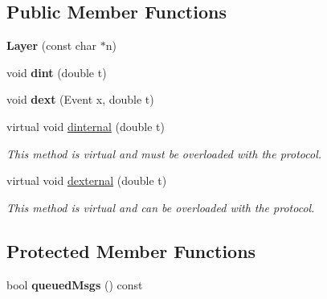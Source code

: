 \subsection*{Public Member Functions}
\begin{DoxyCompactItemize}
\item 
{\bfseries Layer} (const char $\ast$n)\hypertarget{classLayer_a61263cb897fd7d091830e5591c9ae3b0}{}\label{classLayer_a61263cb897fd7d091830e5591c9ae3b0}

\item 
void {\bfseries dint} (double t)\hypertarget{classLayer_ac73462187fad467ee68767488f8cdf25}{}\label{classLayer_ac73462187fad467ee68767488f8cdf25}

\item 
void {\bfseries dext} (Event x, double t)\hypertarget{classLayer_a7e588f39547025f0483fc94a57fc9636}{}\label{classLayer_a7e588f39547025f0483fc94a57fc9636}

\item 
virtual void \hyperlink{classLayer_a1c82b14ba3efc37969f55c633a9b3173}{dinternal} (double t)
\begin{DoxyCompactList}\small\item\em This method is virtual and must be overloaded with the protocol. \end{DoxyCompactList}\item 
virtual void \hyperlink{classLayer_ae21ef24340c6c1f6cf20d66b5ab6a5f7}{dexternal} (double t)
\begin{DoxyCompactList}\small\item\em This method is virtual and can be overloaded with the protocol. \end{DoxyCompactList}\end{DoxyCompactItemize}
\subsection*{Protected Member Functions}
\begin{DoxyCompactItemize}
\item 
bool {\bfseries queued\+Msgs} () const \hypertarget{classLayer_aba0f1461c09e98abc9d28ab9fc438afb}{}\label{classLayer_aba0f1461c09e98abc9d28ab9fc438afb}

\end{DoxyCompactItemize}

